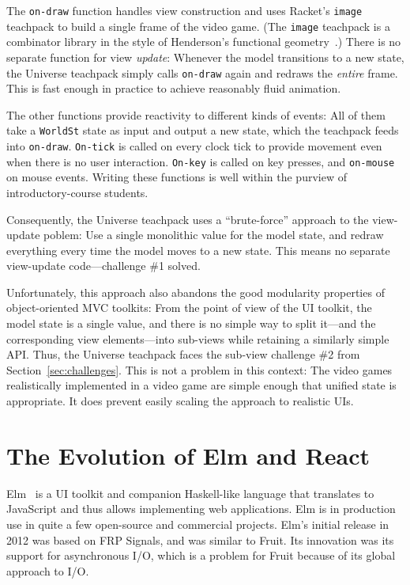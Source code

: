 \documentclass[sigplan,screen]{acmart}
\begin{document}
The \texttt{on-draw} function handles view construction and uses Racket's
\texttt{image} teachpack to build a single frame of the video game.
(The \texttt{image} teachpack is a combinator library in the style of
Henderson's functional geometry~\cite{Henderson1982}.)  There is no
separate function for view \emph{update}: Whenever the model
transitions to a new state, the Universe teachpack simply calls
\texttt{on-draw} again and redraws the \emph{entire} frame.  This is
fast enough in practice to achieve reasonably fluid animation.

The other functions provide reactivity to different kinds of events:
All of them take a \texttt{WorldSt} state as input and output a new
state, which the teachpack feeds into \texttt{on-draw}.
\texttt{On-tick} is called on every clock tick to provide movement
even when there is no user interaction.  \texttt{On-key} is called on
key presses, and \texttt{on-mouse} on mouse events.  Writing these
functions is well within the purview of introductory-course students.

Consequently, the Universe teachpack uses a ``brute-force'' approach
to the view-update poblem: Use a single monolithic value for the model
state, and redraw everything every time the model moves to a new
state.  This means no separate view-update code---challenge \#1
solved.

Unfortunately, this approach also abandons the good modularity
properties of object-oriented MVC toolkits: From the point of view of
the UI toolkit, the model state is a single value, and there is no
simple way to split it---and the corresponding view elements---into
sub-views while retaining a similarly simple API.  Thus, the Universe
teachpack faces the sub-view challenge \#2 from
Section~\ref{sec:challenges}.  This is not a
problem in this context: The video games realistically implemented in
a video game are simple enough that unified state is appropriate.  It
does prevent easily scaling the approach to realistic UIs.


\section{The Evolution of Elm and React}

Elm~\cite{Elm} is a UI toolkit and companion Haskell-like language
that translates to JavaScript and thus allows implementing web
applications.  Elm is in production use in quite a few open-source and
commercial projects.  Elm's initial release in 2012 was based on FRP Signals,
and was similar to Fruit.  Its innovation was its support for
asynchronous I/O, which is a problem for Fruit because of its global
approach to I/O.
\end{document}
